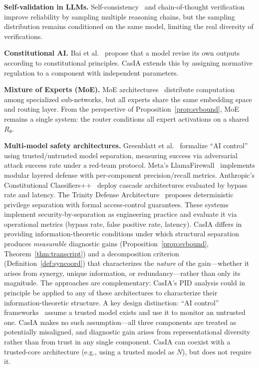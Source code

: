 \documentclass[11pt,a4paper]{article}
\theoremstyle{definition}
\newcommand{\Rtheta}{R_\theta}
\begin{document}
\textbf{Self-validation in LLMs.} Self-consistency~\cite{wang2023selfconsistency} and chain-of-thought verification~\cite{weng2023selfverification} improve reliability by sampling multiple reasoning chains, but the sampling distribution remains conditioned on the same model, limiting the real diversity of verifications.

\textbf{Constitutional AI.} Bai et al.~\cite{bai2022constitutional} propose that a model revise its own outputs according to constitutional principles. CasIA extends this by assigning normative regulation to a component with independent parameters.

\textbf{Mixture of Experts (MoE).} MoE architectures~\cite{shazeer2017moe,fedus2022switch} distribute computation among specialized sub-networks, but all experts share the same embedding space and routing layer. From the perspective of Proposition~\ref{prop:svbound}, MoE remains a single system: the router conditions all expert activations on a shared $\Rtheta$.

\textbf{Multi-model safety architectures.} Greenblatt et al.~\cite{greenblatt2024control} formalize ``AI control'' using trusted/untrusted model separation, measuring success via adversarial attack success rate under a red-team protocol. Meta's LlamaFirewall~\cite{meta2025llamafirewall} implements modular layered defense with per-component precision/recall metrics. Anthropic's Constitutional Classifiers++~\cite{anthropic2026classifiers} deploy cascade architectures evaluated by bypass rate and latency. The Trinity Defense Architecture~\cite{bhattarai2025trinity} proposes deterministic privilege separation with formal access-control guarantees. These systems implement security-by-separation as engineering practice and evaluate it via operational metrics (bypass rate, false positive rate, latency). CasIA differs in providing information-theoretic conditions under which structural separation produces \emph{measurable} diagnostic gains (Proposition~\ref{prop:svbound}, Theorem~\ref{thm:transcript}) and a decomposition criterion (Definition~\ref{def:syncoord}) that characterizes the \emph{nature} of the gain---whether it arises from synergy, unique information, or redundancy---rather than only its magnitude. The approaches are complementary: CasIA's PID analysis could in principle be applied to any of these architectures to characterize their information-theoretic structure. A key design distinction: ``AI control'' frameworks~\cite{greenblatt2024control} assume a trusted model exists and use it to monitor an untrusted one. CasIA makes no such assumption---all three components are treated as potentially misaligned, and diagnostic gain arises from representational diversity rather than from trust in any single component. CasIA can coexist with a trusted-core architecture (e.g., using a trusted model as $N$), but does not require it.
\end{document}
